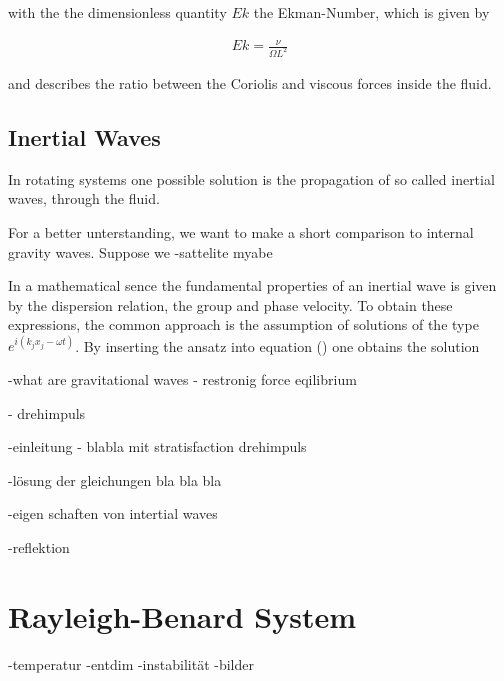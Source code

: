 with the the dimensionless quantity $Ek$ the Ekman-Number, which is given by

\begin{align}
    Ek = \frac{\nu}{\Omega L^2}
\end{align}

and describes the ratio between the Coriolis and viscous forces inside the fluid.

\subsection{Inertial Waves}

In rotating systems one possible solution is the propagation of so called inertial waves, through the fluid.

For a better unterstanding, we want to make a short comparison to internal gravity waves.
Suppose we
-sattelite myabe

In a mathematical sence the fundamental properties of an inertial wave is given by the dispersion relation, the group and phase velocity.
To obtain these expressions, the common approach is the assumption of solutions of the type $e^{i(k_j x_j - \omega t)}$.
By inserting the ansatz into equation () one obtains the solution




-what are gravitational waves
- restronig force eqilibrium

- drehimpuls





-einleitung - blabla mit stratisfaction drehimpuls

-lösung der gleichungen  bla bla bla

-eigen schaften von intertial waves

-reflektion

\section{Rayleigh-Benard System}
-temperatur
-entdim
-instabilität
-bilder





